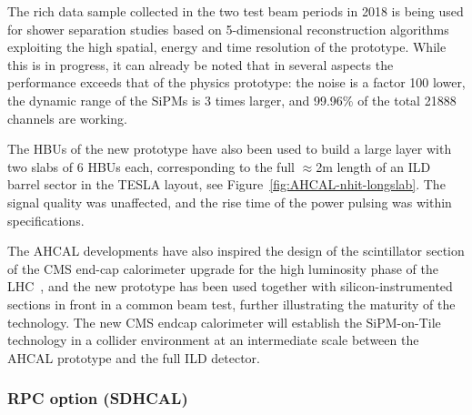 %
%
The rich data sample collected in the two test beam periods in 2018  is being used for shower separation studies based on 5-dimensional reconstruction algorithms exploiting the high spatial, energy and time resolution of the prototype. 
While this is in progress, it can already be noted that in several aspects the  performance exceeds that of the physics prototype: the noise is a factor 100 lower, the dynamic range of the SiPMs is 3 times larger, and 99.96\% of the total 21888 channels are working.

The HBUs of the new prototype have also been used to build a large layer with two slabs of 6 HBUs each, corresponding to the full $\approx$2m length of an ILD barrel sector in the TESLA layout, see Figure~\ref{fig:AHCAL-nhit-longslab}. The signal quality was unaffected, and the rise time of the power pulsing was within specifications. 

The AHCAL developments have also inspired the design of the scintillator section of the CMS end-cap calorimeter upgrade for the high luminosity phase of the LHC~\cite{Collaboration:2293646}, and the new prototype has been used together with silicon-instrumented sections in front in a common beam test, further illustrating the maturity of the technology. 
The new CMS endcap calorimeter will establish the SiPM-on-Tile technology in a collider environment at an intermediate scale between the AHCAL prototype and the full ILD detector. 

\subsubsection{RPC option (SDHCAL)}

